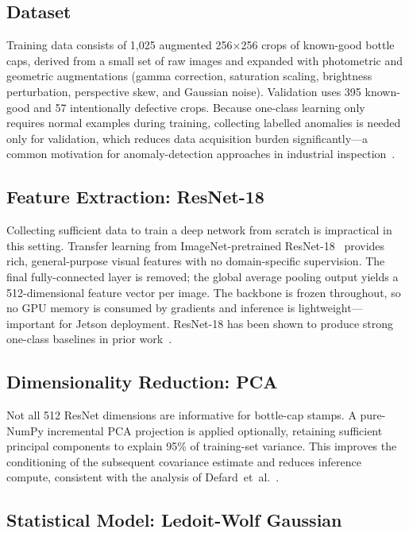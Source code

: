 \subsection{Dataset}

Training data consists of 1,025 augmented 256$\times$256 crops of known-good
bottle caps, derived from a small set of raw images and expanded with
photometric and geometric augmentations (gamma correction, saturation
scaling, brightness perturbation, perspective skew, and Gaussian noise).
Validation uses 395 known-good and 57 intentionally defective crops. Because
one-class learning only requires normal examples during training, collecting
labelled anomalies is needed only for validation, which reduces data
acquisition burden significantly---a common motivation for anomaly-detection
approaches in industrial inspection~\cite{bergmann2019mvtec}.

\subsection{Feature Extraction: ResNet-18}

Collecting sufficient data to train a deep network from scratch is impractical
in this setting. Transfer learning from ImageNet-pretrained
ResNet-18~\cite{he2016resnet} provides rich, general-purpose visual features
with no domain-specific supervision. The final fully-connected layer is
removed; the global average pooling output yields a 512-dimensional feature
vector per image. The backbone is frozen throughout, so no GPU memory is
consumed by gradients and inference is lightweight---important for Jetson
deployment. ResNet-18 has been shown to produce strong one-class baselines in
prior work~\cite{roth2022towards,defard2021padim}.

\subsection{Dimensionality Reduction: PCA}

Not all 512 ResNet dimensions are informative for bottle-cap stamps. A
pure-NumPy incremental PCA projection is applied optionally, retaining
sufficient principal components to explain 95\% of training-set variance.
This improves the conditioning of the subsequent covariance estimate and
reduces inference compute, consistent with the analysis of
Defard~et~al.~\cite{defard2021padim}.

\subsection{Statistical Model: Ledoit-Wolf Gaussian}

